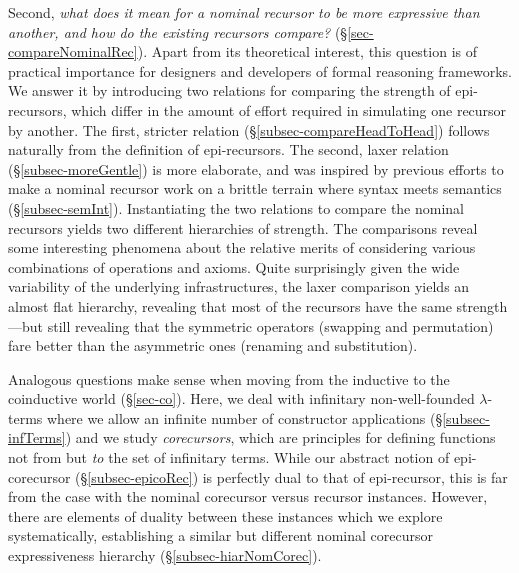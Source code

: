 

Second, \emph{what does it mean for a nominal recursor to be more expressive than another, and how do the existing recursors compare?}  (\S\ref{sec-compareNominalRec}). 
Apart from its theoretical interest, this question is of practical importance for designers and developers of formal reasoning frameworks. 
%
%
We answer it by introducing two relations %
for comparing the strength of epi-recursors, which differ in the amount of effort %
required 
in simulating one recursor by another.  The first, stricter relation (\S\ref{subsec-compareHeadToHead}) follows naturally from the definition of epi-recursors. The second, laxer relation (\S\ref{subsec-moreGentle}) is more elaborate, and was inspired by previous efforts to make a nominal recursor work on a %
brittle 
terrain where syntax %
meets semantics (\S\ref{subsec-semInt}). 
%
Instantiating the two relations to compare the nominal recursors  yields two different hierarchies of strength. The comparisons reveal some interesting phenomena about the relative merits of considering various combinations of operations and axioms. Quite surprisingly given the wide variability of the underlying infrastructures, the laxer comparison yields an almost flat hierarchy, revealing that most of the recursors have the same strength---but still revealing that the  symmetric operators (swapping and permutation) fare better than the asymmetric ones (renaming and  substitution). 

Analogous questions make sense when moving from the inductive to the coinductive world (\S\ref{sec-co}). Here, we deal with infinitary non-well-founded $\lambda$-terms
where we allow an infinite number of constructor applications (\S\ref{subsec-infTerms}) and we study \emph{corecursors}, which are principles for defining functions not from but \emph{to} the set of infinitary terms. 
While our abstract notion of epi-corecursor (\S\ref{subsec-epicoRec}) is perfectly dual to that of epi-recursor, %
this is far from the case 
with the nominal corecursor versus recursor instances. 
However, there are %
elements of duality %
between these instances which we explore systematically,  %
establishing %
a similar but different nominal corecursor expressiveness hierarchy (\S\ref{subsec-hiarNomCorec}). 

